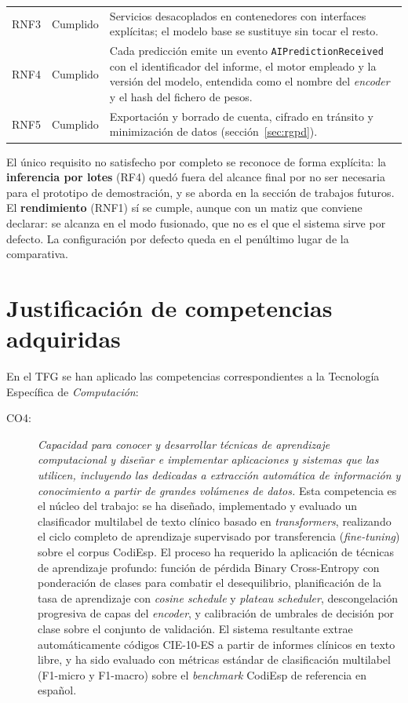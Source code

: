 \begin{table}[h]
\begin{tabular}{llp{7.2cm}}
RNF3 & Cumplido & Servicios desacoplados en contenedores con interfaces explícitas; el modelo base se sustituye sin tocar el resto. \\
RNF4 & Cumplido & Cada predicción emite un evento \texttt{AIPredictionReceived} con el identificador del informe, el motor empleado y la versión del modelo, entendida como el nombre del \emph{encoder} y el hash del fichero de pesos. \\
RNF5 & Cumplido & Exportación y borrado de cuenta, cifrado en tránsito y minimización de datos (sección~\ref{sec:rgpd}). \\
\hline
\end{tabular}
\end{table}

El único requisito no satisfecho por completo se reconoce de forma explícita: la \textbf{inferencia por lotes} (RF4) quedó fuera del alcance final por no ser necesaria para el prototipo de demostración, y se aborda en la sección de trabajos futuros. El \textbf{rendimiento} (RNF1) sí se cumple, aunque con un matiz que conviene declarar: se alcanza en el modo fusionado, que no es el que el sistema sirve por defecto. La configuración por defecto queda en el penúltimo lugar de la comparativa.

\section{Justificación de competencias adquiridas}

En el TFG se han aplicado las competencias correspondientes a la Tecnología Específica de \emph{Computación}:

\begin{description}
 \item[CO4:] \emph{Capacidad para conocer y desarrollar técnicas de aprendizaje computacional y diseñar e implementar aplicaciones y sistemas que las utilicen, incluyendo las dedicadas a extracción automática de información y conocimiento a partir de grandes volúmenes de datos.} Esta competencia es el núcleo del trabajo: se ha diseñado, implementado y evaluado un clasificador multilabel de texto clínico basado en \emph{transformers}, realizando el ciclo completo de aprendizaje supervisado por transferencia (\emph{fine-tuning}) sobre el corpus CodiEsp. El proceso ha requerido la aplicación de técnicas de aprendizaje profundo: función de pérdida Binary Cross-Entropy con ponderación de clases para combatir el desequilibrio, planificación de la tasa de aprendizaje con \emph{cosine schedule} y \emph{plateau scheduler}, descongelación progresiva de capas del \emph{encoder}, y calibración de umbrales de decisión por clase sobre el conjunto de validación. El sistema resultante extrae automáticamente códigos CIE-10-ES a partir de informes clínicos en texto libre, y ha sido evaluado con métricas estándar de clasificación multilabel (F1-micro y F1-macro) sobre el \emph{benchmark} CodiEsp de referencia en español.
\end{description}


